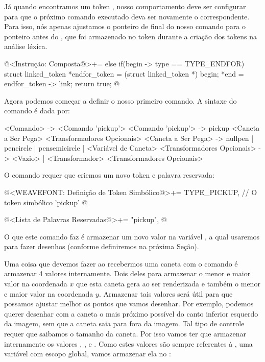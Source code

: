 {{{{{{Já quando encontramos um token , nosso
comportamento deve ser configurar para que o próximo comando executado
deva ser novamente o  correspondente. Para isso, nós
apenas ajustamos o ponteiro de final do nosso comando para o ponteiro
antes do , que foi armazenado no
token  durante a criação dos tokens na análise
léxica.

\iniciocodigo
@<Instrução: Composta@>+=
else if(begin -> type == TYPE_ENDFOR){
  struct linked_token *endfor_token = (struct linked_token *) begin;
  *end = endfor_token -> link;
  return true;
}
@
\fimcodigo



Agora podemos começar a definir o nosso primeiro comando. A sintaxe do
comando  é dada por:

\alinhaverbatim
<Comando> -> <Comando 'pickup'>
<Comando 'pickup'> -> pickup <Caneta a Ser Pega> <Transformadores Opcionais>
<Caneta a Ser Pega> -> nullpen | pencircle | pensemicircle |
                       <Variável de Caneta>
<Transformadores Opcionais> -> <Vazio> |
                               <Transformador> <Transformadores Opcionais>
\alinhanormal

O comando requer que criemos um novo token e palavra reservada:

\iniciocodigo
@<WEAVEFONT: Definição de Token Simbólico@>+=
TYPE_PICKUP,   // O token simbólico 'pickup'
@
\fimcodigo

\iniciocodigo
@<Lista de Palavras Reservadas@>+=
"pickup",
@
\fimcodigo

O que este comando faz é armazenar um novo valor na
variável , a qual usaremos para fazer desenhos
(conforme definiremos na próxima Seção).


Uma coisa que devemos fazer ao recebermos uma caneta com o
comando  é armazenar 4 valores internamente. Dois
deles para armazenar o menor e maior valor na coordenada $x$ que esta
caneta gera ao ser renderizada e também o menor e maior valor na
coordenada $y$. Armazenar tais valores será útil para que possamos
ajustar melhor os pontos que vamos desenhar. Por exemplo, podemos
querer desenhar com a caneta o mais próximo possível do canto inferior
esquerdo da imagem, sem que a caneta saia para fora da imagem. Tal
tipo de controle requer que saibamos o tamanho da caneta. Por isso
vamos ter que armazenar internamente os
valores , , 
e . Como estes valores são sempre referentes
à , uma variável com escopo global, vamos
armazenar ela no :

}}}}}}
